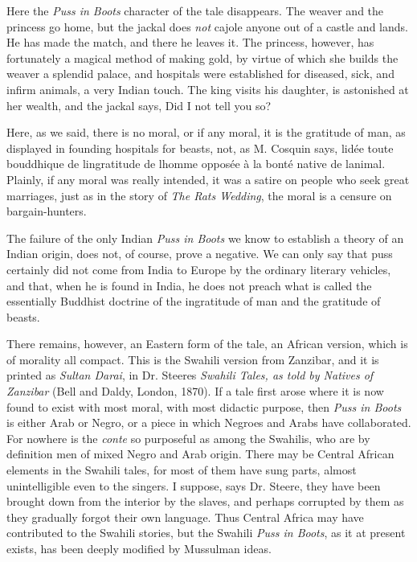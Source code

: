 \documentclass[14pt,a4paper]{memoir}
\begin{document}
{Here the \emph{Puss in Boots} character of the tale disappears. The
weaver and the princess go home, but the jackal does \emph{not} cajole
anyone out of a castle and lands. He has made the match, and there he
leaves it. The princess, however, has fortunately a magical method of
making gold, by virtue of which she builds the weaver a splendid palace,
and \textquotesingle hospitals were established for diseased, sick, and
infirm animals,\textquotesingle{} a very Indian touch. The king visits
his daughter, is astonished at her wealth, and the jackal says,
\textquotesingle Did I not tell you so?\textquotesingle{}

Here, as we said, there is no moral, or if any moral, it is the
gratitude of man, as displayed in founding hospitals for beasts, not, as
M. Cosquin says, \textquotesingle l\textquotesingle idée toute
bouddhique de l\textquotesingle ingratitude de l\textquotesingle homme
opposée à la bonté native de l\textquotesingle animal.\textquotesingle{}
Plainly, if any moral was really intended, it was a satire on people who
seek great marriages, just as in the story of \emph{The
Rat\textquotesingle s Wedding}, the moral is a censure on
bargain-hunters.

The failure of the only Indian \emph{Puss in Boots} we know to establish
a theory of an Indian origin, does not, of course, prove a negative. We
can only say that puss certainly did not come from India to Europe by
the ordinary literary vehicles, and that, when he is found in India, he
does not preach what is called the essentially Buddhist doctrine of the
ingratitude of man and the gratitude of beasts.

There remains, however, an Eastern form of the tale, an African version,
which is of morality all compact. This is the Swahili version from
Zanzibar, and it is printed as \emph{Sultan Darai}, in Dr.
Steere\textquotesingle s \emph{Swahili Tales, as told by Natives of
Zanzibar} (Bell and Daldy, London, 1870). If a tale first arose where it
is now found to exist with most moral, with most didactic purpose, then
\emph{Puss in Boots} is either Arab or Negro, or a piece in which
Negroes and Arabs have collaborated. For nowhere is the \emph{conte} so
purposeful as among the Swahilis, who are by definition
\textquotesingle men of mixed Negro and Arab origin.\textquotesingle{}
There may be Central African elements in the Swahili tales, for most of
them have \textquotesingle sung parts,\textquotesingle{} almost
unintelligible even to the singers. \textquotesingle I
suppose,\textquotesingle{} says Dr. Steere, \textquotesingle they have
been brought down from the interior by the slaves, and perhaps corrupted
by them as they gradually forgot their own language.\textquotesingle{}
Thus Central Africa may have contributed to the Swahili stories, but the
Swahili \emph{Puss in Boots}, as it at present exists, has been deeply
modified by Mussulman ideas.

}
\end{document}
